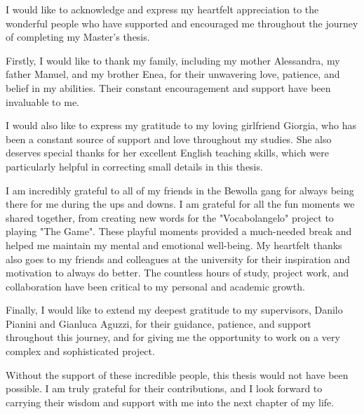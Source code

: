 \begin{acknowledgements} %
I would like to acknowledge and express my heartfelt appreciation to the wonderful people who have supported and encouraged me throughout the journey of completing my Master's thesis.\newline

Firstly, I would like to thank my family, including my mother Alessandra, my father Manuel, and my brother Enea, for their unwavering love, patience, and belief in my abilities. Their constant encouragement and support have been invaluable to me.\newline

I would also like to express my gratitude to my loving girlfriend Giorgia, who has been a constant source of support and love throughout my studies. She also deserves special thanks for her excellent English teaching skills, which were particularly helpful in correcting small details in this thesis.\newline

I am incredibly grateful to all of my friends in the Bewolla gang for always being there for me during the ups and downs. I am grateful for all the fun moments we shared together, from creating new words for the "Vocabolangelo" project to playing "The Game". These playful moments provided a much-needed break and helped me maintain my mental and emotional well-being. My heartfelt thanks also goes to my friends and colleagues at the university for their inspiration and motivation to always do better. The countless hours of study, project work, and collaboration have been critical to my personal and academic growth.\newline

Finally, I would like to extend my deepest gratitude to my supervisors, Danilo Pianini and Gianluca Aguzzi, for their guidance, patience, and support throughout this journey, and for giving me the opportunity to work on a very complex and
sophisticated project.\newline

Without the support of these incredible people, this thesis would not have been possible. I am truly grateful for their contributions, and I look forward to carrying their wisdom and support with me into the next chapter of my life.
\end{acknowledgements}
